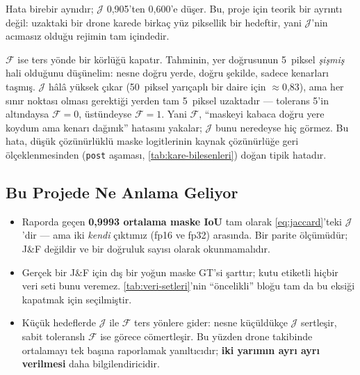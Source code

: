 Hata birebir aynıdır; $\mathcal{J}$ 0,905'ten 0,600'e düşer. Bu,
proje için teorik bir ayrıntı değil: uzaktaki bir drone karede birkaç
yüz piksellik bir hedeftir, yani $\mathcal{J}$'nin acımasız olduğu
rejimin tam içindedir.

$\mathcal{F}$ ise ters yönde bir körlüğü kapatır. Tahminin, yer
doğrusunun 5~piksel \emph{şişmiş} hali olduğunu düşünelim: nesne doğru
yerde, doğru şekilde, sadece kenarları taşmış. $\mathcal{J}$ hâlâ
yüksek çıkar (50~piksel yarıçaplı bir daire için $\approx$0,83), ama her
sınır noktası olması gerektiği yerden tam 5~piksel uzaktadır ---
tolerans 5'in altındaysa $\mathcal{F}=0$, üstündeyse $\mathcal{F}=1$.
Yani $\mathcal{F}$, ``maskeyi kabaca doğru yere koydum ama kenarı
dağınık'' hatasını yakalar; $\mathcal{J}$ bunu neredeyse hiç görmez.
Bu hata, düşük çözünürlüklü maske logitlerinin kaynak çözünürlüğe geri
ölçeklenmesinden (\texttt{post} aşaması,
\cref{tab:kare-bilesenleri}) doğan tipik hatadır.

\subsection*{Bu Projede Ne Anlama Geliyor}

\begin{itemize}
  \item Raporda geçen \textbf{0,9993 ortalama maske IoU} tam olarak
        \cref{eq:jaccard}'teki $\mathcal{J}$'dir --- ama iki
        \emph{kendi} çıktımız (fp16 ve fp32) arasında. Bir parite
        ölçümüdür; J\&F değildir ve bir doğruluk sayısı olarak
        okunmamalıdır.
  \item Gerçek bir J\&F için dış bir yoğun maske GT'si şarttır; kutu
        etiketli hiçbir veri seti bunu veremez.
        \cref{tab:veri-setleri}'nin ``öncelikli'' bloğu tam da bu
        eksiği kapatmak için seçilmiştir.
  \item Küçük hedeflerde $\mathcal{J}$ ile $\mathcal{F}$ ters yönlere
        gider: nesne küçüldükçe $\mathcal{J}$ sertleşir, sabit
        toleranslı $\mathcal{F}$ ise görece cömertleşir. Bu yüzden
        drone takibinde ortalamayı tek başına raporlamak yanıltıcıdır;
        \textbf{iki yarımın ayrı ayrı verilmesi} daha bilgilendiricidir.
\end{itemize}
